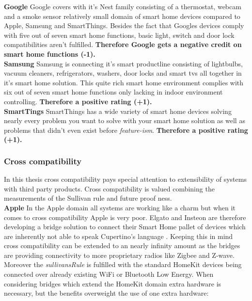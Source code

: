 			\textbf{Google}
				Google covers with it's Nest family consisting of a thermostat, webcam and a smoke sensor relatively small domain of smart home devices compared to Apple, Samsung and SmartThings. Besides the fact that Googles devices comply with five out of seven smart home functions, basic light, switch and door lock compatibilities aren't fulfilled. \textbf{Therefore Google gets a negative credit on smart home functions (-1).}\\

			\textbf{Samsung}
				Samsung is connecting it's smart productline consisting of lightbulbs, vacuum cleaners, refrigerators, washers, door locks and smart tvs all together in it's smart home solution. This quite rich smart home environment complies with six out of seven smart home functions only lacking in indoor environment controlling. \textbf{Therefore a positive rating (+1).}\\

			\textbf{SmartTings}
				SmartThings has a wide variety of smart home devices solving nearly every problem you want to solve with your smart home solution as well as problems that didn't even exist before \textit{feature-ism}. \textbf{Therefore a positive rating (+1).}

				\pagebreak

		\subsubsection{Cross compatibility}
			In this thesis cross compatibility pays special attention to extensibility of systems with third party products. Cross compatibility is valued combining the measurements of the Sullivan rule and future proof ness.\\

			\textbf{Apple}
				In the Apple domain all systems are working like a charm but when it comes to cross compatibility Apple is very poor. Elgato and Insteon  are therefore developing a bridge solution to connect their Smart Home pallet of devices which are inherently not able to speak Cupertino's language \parencite{HomeKitFutureProofness}. Keeping this in mind cross compatibility can be extended to an nearly infinity amount as the bridges are providing connectivity to more proprietary radios like Zigbee and Z-wave. Moreover the \textit{sullivansRule} is fulfilled with the standard HomeKit devices being connected over already existing WiFi or Bluetooth Low Energy. When considering bridges which extend the HomeKit domain extra hardware is necessary, but the benefits overweight the use of one extra hardware:

